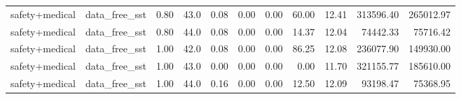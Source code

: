 \begin{table}[H]
{\begin{tabular}{llllrrrrrrr}
safety+medical & data\_free\_sst & 0.80 & 43.0 & 0.08 & 0.00 & 0.00 & 60.00 & 12.41 & 313596.40 & 265012.97 \\
safety+medical & data\_free\_sst & 0.80 & 44.0 & 0.08 & 0.00 & 0.00 & 14.37 & 12.04 & 74442.33 & 75716.42 \\
safety+medical & data\_free\_sst & 1.00 & 42.0 & 0.08 & 0.00 & 0.00 & 86.25 & 12.08 & 236077.90 & 149930.00 \\
safety+medical & data\_free\_sst & 1.00 & 43.0 & 0.00 & 0.00 & 0.00 & 0.00 & 11.70 & 321155.77 & 185610.00 \\
safety+medical & data\_free\_sst & 1.00 & 44.0 & 0.16 & 0.00 & 0.00 & 12.50 & 12.09 & 93198.47 & 75368.95 \\
\bottomrule
\end{tabular}
}
\end{table}